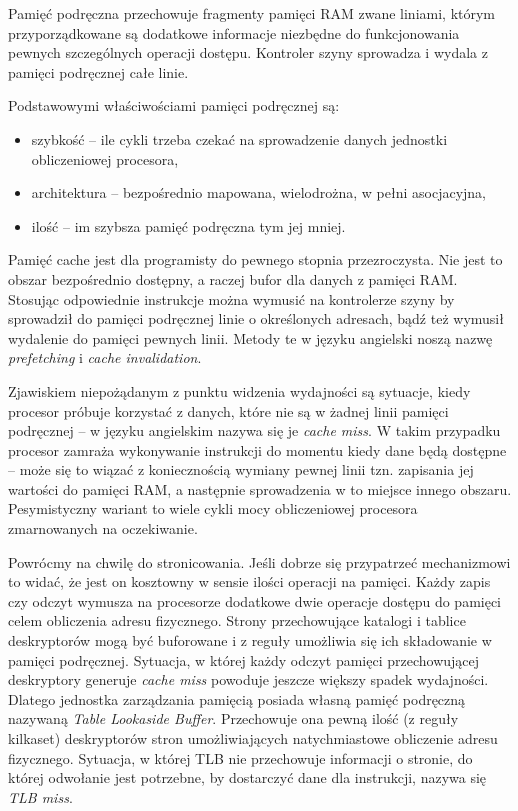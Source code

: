 \documentclass[12pt,a4paper,titlepage,twoside]{mwart}
\begin{document}
Pamięć podręczna przechowuje fragmenty pamięci RAM zwane liniami, którym
przyporządkowane są dodatkowe informacje niezbędne do funkcjonowania pewnych
szczególnych operacji dostępu. Kontroler szyny sprowadza i wydala z pamięci
podręcznej całe linie.

Podstawowymi właściwościami pamięci podręcznej są:
\begin{itemize}
\item szybkość -- ile cykli trzeba czekać na sprowadzenie danych jednostki
obliczeniowej procesora,
\item architektura -- bezpośrednio mapowana, wielodrożna, w pełni asocjacyjna,
\item ilość -- im szybsza pamięć podręczna tym jej mniej. 
\end{itemize}

Pamięć cache jest dla programisty do pewnego stopnia przezroczysta. Nie jest to
obszar bezpośrednio dostępny, a raczej bufor dla danych z pamięci RAM. Stosując
odpowiednie instrukcje można wymusić na kontrolerze szyny by sprowadził do
pamięci podręcznej linie o określonych adresach, bądź też wymusił wydalenie do
pamięci pewnych linii. Metody te w języku angielski noszą nazwę
\textit{prefetching} i \textit{cache invalidation}.

Zjawiskiem niepożądanym z punktu widzenia wydajności są sytuacje, kiedy
procesor próbuje korzystać z danych, które nie są w żadnej linii pamięci
podręcznej -- w języku angielskim nazywa się je \textit{cache miss}. W takim
przypadku procesor zamraża wykonywanie instrukcji do momentu kiedy dane będą
dostępne -- może się to wiązać z koniecznością wymiany pewnej linii tzn.
zapisania jej wartości do pamięci RAM, a następnie sprowadzenia w to miejsce
innego obszaru. Pesymistyczny wariant to wiele cykli mocy obliczeniowej
procesora zmarnowanych na oczekiwanie.

Powrócmy na chwilę do stronicowania. Jeśli dobrze się przypatrzeć mechanizmowi
to widać, że jest on kosztowny w sensie ilości operacji na pamięci. Każdy zapis
czy odczyt wymusza na procesorze dodatkowe dwie operacje dostępu do pamięci
celem obliczenia adresu fizycznego. Strony przechowujące katalogi i tablice
deskryptorów mogą być buforowane i z reguły umożliwia się ich składowanie w
pamięci podręcznej. Sytuacja, w której każdy odczyt pamięci przechowującej
deskryptory generuje \textit{cache miss} powoduje jeszcze większy spadek
wydajności. Dlatego jednostka zarządzania pamięcią posiada własną pamięć
podręczną nazywaną \textit{Table Lookaside Buffer}. Przechowuje ona pewną ilość
(z reguły kilkaset) deskryptorów stron umożliwiających natychmiastowe
obliczenie adresu fizycznego. Sytuacja, w której TLB nie przechowuje informacji
o stronie, do której odwołanie jest potrzebne, by dostarczyć dane dla
instrukcji, nazywa się \textit{TLB miss}.
\end{document}
